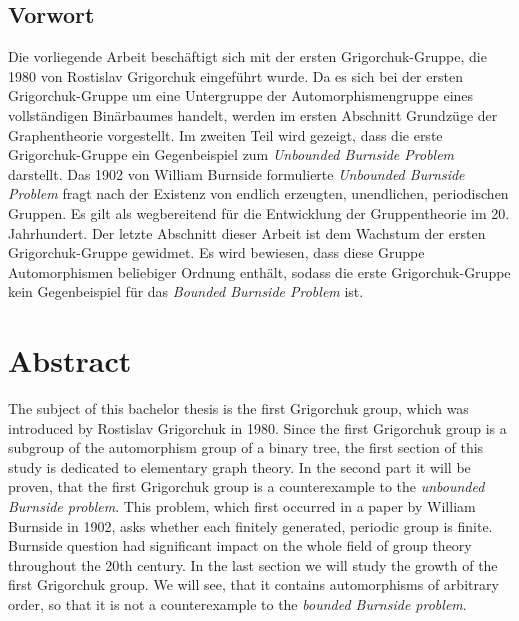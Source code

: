 \thispagestyle{empty}

\begin{de}
\section*{Vorwort}
Die vorliegende Arbeit besch\"aftigt sich mit der ersten Grigorchuk-Gruppe, die 1980 von Rostislav Grigorchuk eingef\"uhrt wurde. Da es sich bei der ersten Grigorchuk-Gruppe um eine Untergruppe der Automorphismengruppe eines vollst\"andigen Bin\"arbaumes handelt, werden im ersten Abschnitt Grundz\"uge der Graphentheorie vorgestellt. Im zweiten Teil wird gezeigt, dass die erste Grigorchuk-Gruppe ein Gegenbeispiel zum \emph{Unbounded Burnside Problem} darstellt. Das 1902 von William Burnside formulierte \emph{Unbounded Burnside Problem} fragt nach der Existenz von  endlich erzeugten, unendlichen, periodischen Gruppen. Es gilt als wegbereitend f\"ur die Entwicklung der Gruppentheorie im 20. Jahrhundert. Der letzte Abschnitt dieser Arbeit ist dem Wachstum der ersten Grigorchuk-Gruppe gewidmet. Es wird bewiesen, dass diese Gruppe Automorphismen beliebiger Ordnung enth\"alt, sodass die erste Grigorchuk-Gruppe kein Gegenbeispiel f\"ur das \emph{Bounded Burnside Problem} ist.
\end{de}

\section*{Abstract}
The subject of this bachelor thesis is the first Grigorchuk group, which was introduced by Rostislav Grigorchuk in 1980. Since the first Grigorchuk group is a subgroup of the automorphism group of a binary tree, the first section of this study is dedicated to elementary graph theory. In the second part it will be proven, that the first Grigorchuk group is a counterexample to the \emph{unbounded Burnside problem}. This problem, which first occurred in a paper by William Burnside in 1902, asks whether each finitely generated, periodic group is finite. Burnside question had significant impact on the whole field of group theory throughout the 20th century. In the last section we will study the growth of the first Grigorchuk group. We will see, that it contains automorphisms of arbitrary order, so that it is not a counterexample to the \emph{bounded Burnside problem}.

\newpage